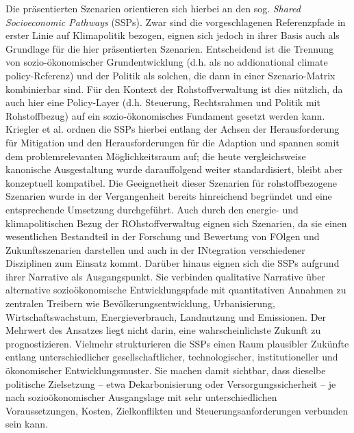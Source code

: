 \documentclass[12pt,a4paper,oneside]{book} %
\begin{document}
Die präsentierten Szenarien orientieren sich hierbei an den sog. \textit{Shared Socioeconomic Pathways} (SSPs).\autocite{Kriegler et al 2012} Zwar sind die vorgeschlagenen Referenzpfade in erster Linie auf Klimapolitik bezogen, eignen sich jedoch in ihrer Basis auch als Grundlage für die hier präsentierten Szenarien. Entscheidend ist die Trennung von sozio-ökonomischer Grundentwicklung (d.h. als \glqq no addionational climate policy\grqq-Referenz) und der Politik als solchen, die dann in einer Szenario-Matrix kombinierbar sind. Für den Kontext der Rohstoffverwaltung ist dies nützlich, da auch hier eine Policy-Layer (d.h. Steuerung, Rechtsrahmen und Politik mit Rohstoffbezug) auf ein sozio-ökonomisches Fundament gesetzt werden kann. Kriegler et al. ordnen die SSPs hierbei entlang der Achsen der Herausforderung für Mitigation und den Herausforderungen für die Adaption und spannen somit dem problemrelevanten Möglichkeitsraum auf; die heute vergleichsweise kanonische Ausgestaltung wurde darauffolgend weiter standardisiert, bleibt aber konzeptuell kompatibel.\autocite[Siehe exemplarisch]{https://link.springer.com/article/10.1007/s10584-013-0905-2} Die Geeignetheit dieser Szenarien für rohstoffbezogene Szenarien wurde in der Vergangenheit bereits hinreichend begründet und eine entsprechende Umsetzung durchgeführt.\autocites{67 DERA Rohstoffinformationen}{Marscheider Weidemann et al. 2021} Auch durch den energie- und klimapolitischen Bezug der ROhstoffverwaltug eignen sich Szenarien, da sie einen wesentlichen Bestandteil in der Forschung und Bewertung von FOlgen und Zukunftsszenarien darstellen und auch in der INtegration verschiedener Disziplinen zum Einsatz kommt.\autocite{https://doi.org/10.1016/j.gloenvcha.2016.05.009} Darüber hinaus eignen sich die SSPs aufgrund ihrer Narrative als Ausgangspunkt. Sie verbinden qualitative Narrative über alternative sozioökonomische Entwicklungspfade mit quantitativen Annahmen zu zentralen Treibern wie Bevölkerungsentwicklung, Urbanisierung, Wirtschaftswachstum, Energieverbrauch, Landnutzung und Emissionen. Der Mehrwert des Ansatzes liegt nicht darin, eine wahrscheinlichste Zukunft zu prognostizieren. Vielmehr strukturieren die SSPs einen Raum plausibler Zukünfte entlang unterschiedlicher gesellschaftlicher, technologischer, institutioneller und ökonomischer Entwicklungsmuster. Sie machen damit sichtbar, dass dieselbe politische Zielsetzung – etwa Dekarbonisierung oder Versorgungssicherheit – je nach sozioökonomischer Ausgangslage mit sehr unterschiedlichen Voraussetzungen, Kosten, Zielkonflikten und Steuerungsanforderungen verbunden sein kann.
\end{document}
